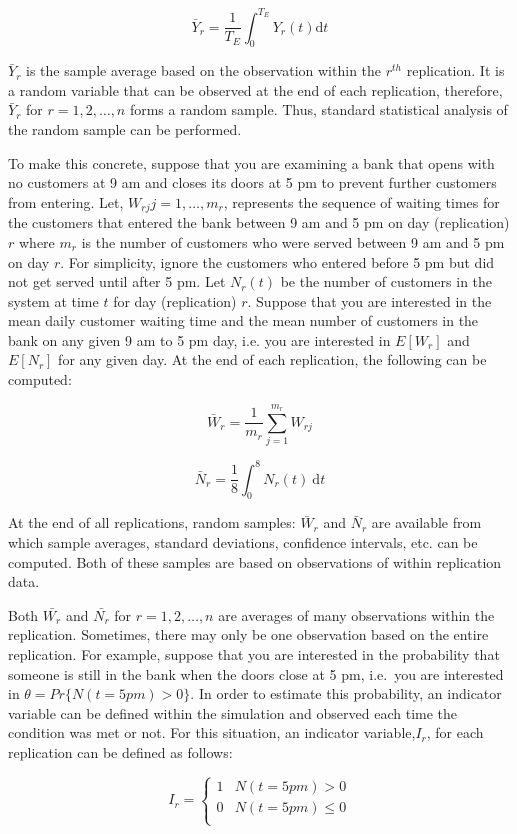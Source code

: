 \documentclass[
]{book}
\theoremstyle{definition}
\theoremstyle{definition}
\theoremstyle{definition}
\theoremstyle{definition}
\theoremstyle{remark}
\begin{document}
\[\bar{Y}_r = \frac{1}{T_E}  \int_0^{T_E} Y_r(t) \mathrm{d}t\]

\(\bar{Y}_r\) is the sample average based on the observation within the
\(r^{th}\) replication. It is a random variable that can be observed at
the end of each replication, therefore, \(\bar{Y}_r\) for
\(r = 1,2,\ldots,n\) forms a random sample. Thus, standard statistical
analysis of the random sample can be performed.

To make this concrete, suppose that you are examining a bank that opens
with no customers at 9 am and closes its doors at 5 pm to prevent
further customers from entering. Let, \(W_{rj} j = 1,\ldots,m_r\),
represents the sequence of waiting times for the customers that entered
the bank between 9 am and 5 pm on day (replication) \(r\) where \(m_r\) is
the number of customers who were served between 9 am and 5 pm on day
\(r\). For simplicity, ignore the customers who entered before 5 pm but
did not get served until after 5 pm. Let \(N_r (t)\) be the number of
customers in the system at time \(t\) for day (replication) \(r\). Suppose
that you are interested in the mean daily customer waiting time and the
mean number of customers in the bank on any given 9 am to 5 pm day, i.e.
you are interested in \(E[W_r]\) and \(E[N_r]\) for any given day. At the
end of each replication, the following can be computed:

\[\bar{W}_r = \frac{1}{m_r} \sum_{j=1}^{m_r} W_{rj}\]

\[\bar{N}_r = \dfrac{1}{8}\int_0^8 N_r(t)\ \mathrm{d}t\]

At the end of all replications, random samples: \(\bar{W}_r\) and
\(\bar{N}_r\) are available from which sample averages, standard
deviations, confidence intervals, etc. can be computed. Both of these
samples are based on observations of within replication data.

Both \(\bar{W_r}\) and \(\bar{N_r}\) for \(r = 1,2,\ldots,n\) are averages of many observations
within the replication. Sometimes, there may only be one observation
based on the entire replication. For example, suppose that you are
interested in the probability that someone is still in the bank when the
doors close at 5 pm, i.e.~you are interested in
\(\theta = Pr\{N(t = 5 pm) > 0\}\). In order to estimate this probability,
an indicator variable can be defined within the simulation and observed
each time the condition was met or not. For this situation, an indicator
variable,\(I_r\), for each replication can be defined as follows:

\[
I_r =
   \begin{cases}
     1 & N(t = 5 pm) > 0\\
     0 & N(t = 5 pm) \leq 0 \\
  \end{cases}
\]
\end{document}
